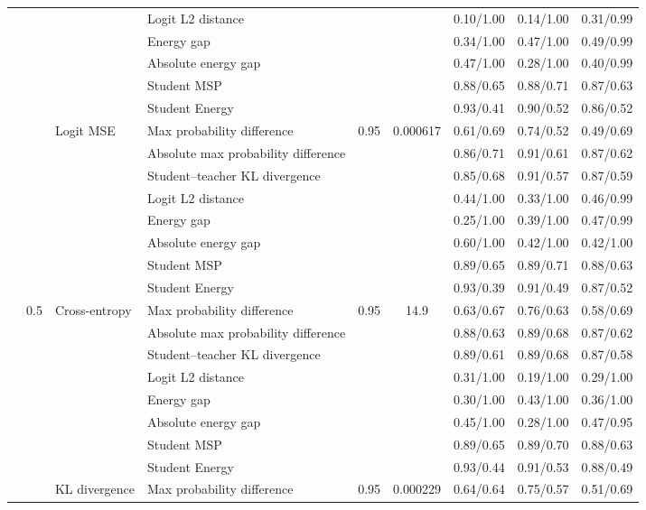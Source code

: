 \documentclass[border=2pt]{standalone}
\begin{document}
\begin{tabular}{llllccccc}
 &  &  & Logit L2 distance &  &  & 0.10/1.00 & 0.14/1.00 & 0.31/0.99 \\
 &  &  & Energy gap &  &  & 0.34/1.00 & 0.47/1.00 & 0.49/0.99 \\
 &  &  & Absolute energy gap &  &  & 0.47/1.00 & 0.28/1.00 & 0.40/0.99 \\
 &  &  & Student MSP &  &  & 0.88/0.65 & 0.88/0.71 & 0.87/0.63 \\
 &  &  & Student Energy &  &  & 0.93/0.41 & 0.90/0.52 & 0.86/0.52 \\
\addlinespace
 &  & Logit MSE & Max probability difference & 0.95 & 0.000617 & 0.61/0.69 & 0.74/0.52 & 0.49/0.69 \\
 &  &  & Absolute max probability difference &  &  & 0.86/0.71 & 0.91/0.61 & 0.87/0.62 \\
 &  &  & Student--teacher KL divergence &  &  & 0.85/0.68 & 0.91/0.57 & 0.87/0.59 \\
 &  &  & Logit L2 distance &  &  & 0.44/1.00 & 0.33/1.00 & 0.46/0.99 \\
 &  &  & Energy gap &  &  & 0.25/1.00 & 0.39/1.00 & 0.47/0.99 \\
 &  &  & Absolute energy gap &  &  & 0.60/1.00 & 0.42/1.00 & 0.42/1.00 \\
 &  &  & Student MSP &  &  & 0.89/0.65 & 0.89/0.71 & 0.88/0.63 \\
 &  &  & Student Energy &  &  & 0.93/0.39 & 0.91/0.49 & 0.87/0.52 \\
\addlinespace
 & 0.5 & Cross-entropy & Max probability difference & 0.95 & 14.9 & 0.63/0.67 & 0.76/0.63 & 0.58/0.69 \\
 &  &  & Absolute max probability difference &  &  & 0.88/0.63 & 0.89/0.68 & 0.87/0.62 \\
 &  &  & Student--teacher KL divergence &  &  & 0.89/0.61 & 0.89/0.68 & 0.87/0.58 \\
 &  &  & Logit L2 distance &  &  & 0.31/1.00 & 0.19/1.00 & 0.29/1.00 \\
 &  &  & Energy gap &  &  & 0.30/1.00 & 0.43/1.00 & 0.36/1.00 \\
 &  &  & Absolute energy gap &  &  & 0.45/1.00 & 0.28/1.00 & 0.47/0.95 \\
 &  &  & Student MSP &  &  & 0.89/0.65 & 0.89/0.70 & 0.88/0.63 \\
 &  &  & Student Energy &  &  & 0.93/0.44 & 0.91/0.53 & 0.88/0.49 \\
\addlinespace
 &  & KL divergence & Max probability difference & 0.95 & 0.000229 & 0.64/0.64 & 0.75/0.57 & 0.51/0.69 \\

\end{tabular}
\end{document}
